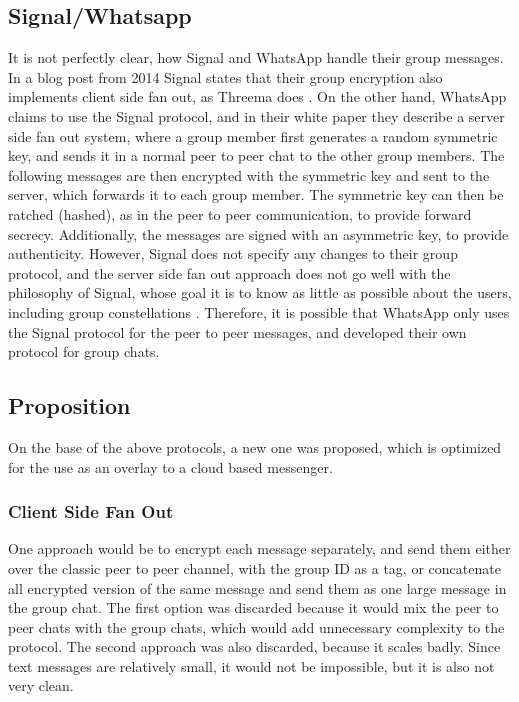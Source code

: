 \documentclass[a4paper, oneside]{discothesis}
\begin{document}
\subsection{Signal/Whatsapp}

It is not perfectly clear, how Signal and WhatsApp handle their group messages. In a blog post from 2014 Signal states that their group encryption also implements client side fan out, as Threema does \cite{SignalGroupsOld}. On the other hand, WhatsApp claims to use the Signal protocol, and in their white paper they describe a server side fan out system, where a group member first generates a random symmetric key, and sends it in a normal peer to peer chat to the other group members. The following messages are then encrypted with the symmetric key and sent to the server, which forwards it to each group member\cite{Whatsapp}. The symmetric key can then be ratched (hashed), as in the peer to peer communication, to provide forward secrecy. Additionally, the messages are signed with an asymmetric key, to provide authenticity. However, Signal does not specify any changes to their group protocol, and the server side fan out approach does not go well with the philosophy of Signal, whose goal it is to know as little as possible about the users, including group constellations \cite{SignalGroupsNew}. Therefore, it is possible that WhatsApp only uses the Signal protocol for the peer to peer messages, and developed their own protocol for group chats.

\subsection{Proposition}
On the base of the above protocols, a new one was proposed, which is optimized for the use as an overlay to a cloud based messenger.

\subsubsection{Client Side Fan Out}
\label{sec:server_side_fan_out}

One approach would be to encrypt each message separately, and send them either over the classic peer to peer channel, with the group ID as a tag, or concatenate all encrypted version of the same message and send them as one large message in the group chat. The first option was discarded because it would mix the peer to peer chats with the group chats, which would add unnecessary complexity to the protocol. The second approach was also discarded, because it scales badly. Since text messages are relatively small, it would not be impossible, but it is also not very clean.
\end{document}
